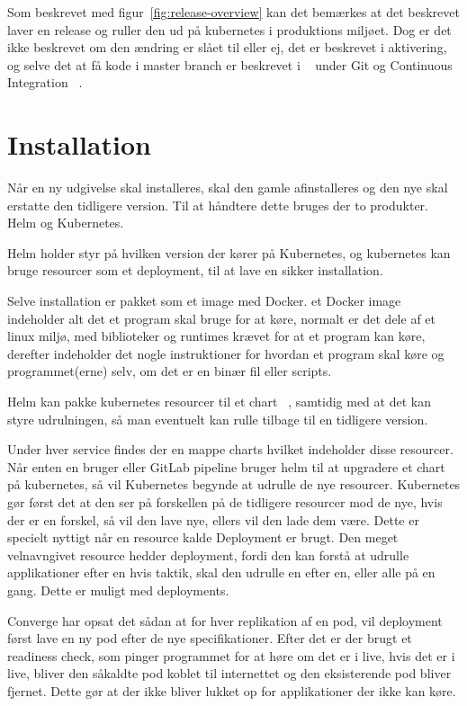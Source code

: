 Som beskrevet med figur~\ref{fig:release-overview} kan det bemærkes at det beskrevet laver en release og ruller den ud på kubernetes i produktions miljøet. Dog er det ikke beskrevet om den ændring er slået til eller ej, det er beskrevet i aktivering, og selve det at få kode i master branch er beskrevet i ~\cite{documentation_development} under Git og Continuous Integration ~\cite{documentation_terms}.

\section{Installation}

Når en ny udgivelse skal installeres, skal den gamle afinstalleres og den nye skal erstatte den tidligere version. Til at håndtere dette bruges der to produkter. Helm og Kubernetes.

Helm holder styr på hvilken version der kører på Kubernetes, og kubernetes kan bruge resourcer som et deployment, til at lave en sikker installation.

Selve installation er pakket som et image med Docker. et Docker image indeholder alt det et program skal bruge for at køre, normalt er det dele af et linux miljø, med biblioteker og runtimes krævet for at et program kan køre, derefter indeholder det nogle instruktioner for hvordan et program skal køre og programmet(erne) selv, om det er en binær fil eller scripts.

Helm kan pakke kubernetes resourcer til et chart ~\cite[Chart]{helm_chart}, samtidig med at det kan styre udrulningen, så man eventuelt kan rulle tilbage til en tidligere version.

Under hver service findes der en mappe charts hvilket indeholder disse resourcer. Når enten en bruger eller GitLab pipeline bruger helm til at upgradere et chart på kubernetes, så vil Kubernetes begynde at udrulle de nye resourcer. Kubernetes gør først det at den ser på forskellen på de tidligere resourcer mod de nye, hvis der er en forskel, så vil den lave nye, ellers vil den lade dem være. Dette er specielt nyttigt når en resource kalde Deployment er brugt. Den meget velnavngivet resource hedder deployment, fordi den kan forstå at udrulle applikationer efter en hvis taktik, skal den udrulle en efter en, eller alle på en gang. Dette er muligt med deployments.

Converge har opsat det sådan at for hver replikation af en pod, vil deployment først lave en ny pod efter de nye specifikationer. Efter det er der brugt et readiness check, som pinger programmet for at høre om det er i live, hvis det er i live, bliver den såkaldte pod koblet til internettet og den eksisterende pod bliver fjernet. Dette gør at der ikke bliver lukket op for applikationer der ikke kan køre.

